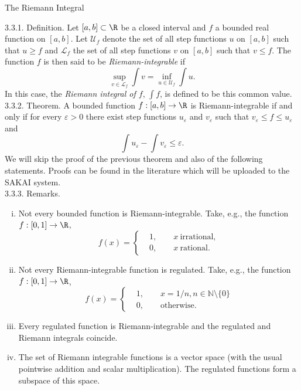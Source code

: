 \documentclass[smaller,hyperref={CJKbookmarks=true}]{beamer}
\newcommand{\N}{\mathbb{N}}
\begin{document}
\begin{frame}{The Riemann Integral}
\begin{spacing}{1.05}
\alert{3.3.1. Definition.} Let $[a,b]\subset\R$ be a closed interval and $f$ a bounded real function on $[a,b]$. Let $\mathcal{U}_f$ denote the set of all step functions $u$ on $[a,b]$ such that $u\geq f$ and $\mathcal{L}_f$ the set of all step functions $v$ on $[a,b]$ such that $v\leq f$. The function $f$ is then said to be \emph{Riemann-integrable} if
\[\sup_{v\in\mathcal{L}_f}\int v=
\inf_{u\in\mathcal{U}_f}\int u.\]
In this case, the \emph{Riemann integral of $f$}, $\int f$, is defined to be this common value.\\[6pt]
\alert{3.3.2. Theorem.} A bounded function $f:[a,b]\to\R$ is Riemann-integrable if and only if for every $\varepsilon>0$ there exist step functions $u_\varepsilon$ and $v_\varepsilon$ such that $v_\varepsilon\leq f\leq u_\varepsilon$ and
\[\int u_\varepsilon-\int v_\varepsilon\leq\varepsilon.\]
\newpage
We will skip the proof of the previous theorem and also of the following
statements. Proofs can be found in the literature which will be uploaded
to the SAKAI system.\\[5pt]
\alert{3.3.3. Remarks.}
\begin{enumerate}[(i)]
  \item Not every bounded function is Riemann-integrable. Take, e.g., the function $f:[0,1]\to\R$,
      \[f(x)=\left\{\begin{aligned}
                      &1,\qquad x~\text{irrational},\\
                      &0,\qquad
                      x~\text{rational}.
                    \end{aligned}\right.\]
  \item Not every Riemann-integrable function is regulated. Take, e.g., the
function $f:[0,1]\to\R$,
\[f(x)=\left\{\begin{aligned}
                &1,\qquad x=1/n,n\in\N\setminus\{0\}\\
                &0,\qquad
                \text{otherwise}.
              \end{aligned}\right.\]
\newpage
  \item Every regulated function is Riemann-integrable and the regulated and
Riemann integrals coincide.
  \item The set of Riemann integrable functions is a vector space (with the
usual pointwise addition and scalar multiplication). The regulated
functions form a subspace of this space.

\end{enumerate}
\end{spacing}
\end{frame}
\end{document}
